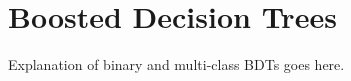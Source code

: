 \chapter{Boosted Decision Trees}
\label{chap:BDTs}

Explanation of binary and multi-class BDTs goes here.
